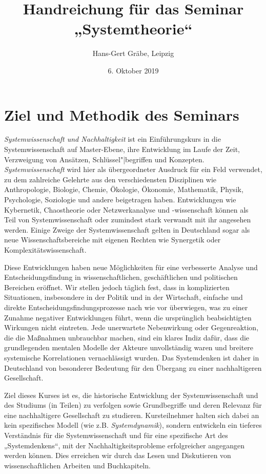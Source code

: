 \documentclass[11pt,a4paper]{article}
\title{Handreichung für das Seminar „Systemtheorie“}
\author{Hans-Gert Gr\"abe, Leipzig}
\date{6. Oktober 2019}
\begin{document}
\maketitle

\section{Ziel und Methodik des Seminars}

\emph{Systemwissenschaft und Nachhaltigkeit} ist ein Einführungskurs in die
Systemwissenschaft auf Master-Ebene, ihre Entwicklung im Laufe der Zeit,
Verzweigung von Ansätzen, Schlüssel"|begriffen und Konzepten.
\emph{Systemwissenschaft} wird hier als übergeordneter Ausdruck für ein Feld
verwendet, zu dem zahlreiche Gelehrte aus den verschiedensten Disziplinen wie
Anthropologie, Biologie, Chemie, Ökologie, Ökonomie, Mathematik, Physik,
Psychologie, Soziologie und andere beigetragen haben. Entwicklungen wie
Kybernetik, Chaostheorie oder Netzwerkanalyse und -wissenschaft können als
Teil von Systemwissenschaft oder zumindest stark verwandt mit ihr angesehen
werden.  Einige Zweige der Systemwissenschaft gelten in Deutschland sogar als
neue Wissenschaftsbereiche mit eigenen Rechten wie Synergetik oder
Komplexitätswissenschaft.

Diese Entwicklungen haben neue Möglichkeiten für eine verbesserte Analyse und
Entscheidungsfindung in wissenschaftlichen, geschäftlichen und politischen
Bereichen eröffnet. Wir stellen jedoch täglich fest, dass in komplizierten
Situationen, insbesondere in der Politik und in der Wirtschaft, einfache und
direkte Entscheidungsfindungsprozesse nach wie vor überwiegen, was zu einer
Zunahme negativer Entwicklungen führt, wenn die ursprünglich beabsichtigten
Wirkungen nicht eintreten. Jede unerwartete Nebenwirkung oder Gegenreaktion,
die die Maßnahmen unbrauchbar machen, sind ein klares Indiz dafür, dass die
grundlegenden mentalen Modelle der Akteure unvollständig waren und breitere
systemische Korrelationen vernachlässigt wurden. Das Systemdenken ist daher in
Deutschland von besonderer Bedeutung für den Übergang zu einer nachhaltigeren
Gesellschaft.

Ziel dieses Kurses ist es, die historische Entwicklung der Systemwissenschaft
und des Studiums (in Teilen) zu verfolgen sowie Grundbegriffe und deren
Relevanz für eine nachhaltigere Gesellschaft zu studieren. Kursteilnehmer
halten sich dabei an kein spezifisches Modell (wie z.B. \emph{Systemdynamik}),
sondern entwickeln ein tieferes Verständnis für die Systemwissenschaft und für
eine spezifische Art des „Systemdenkens“, mit der Nachhaltigkeitsprobleme
erfolgreicher angegangen werden können. Dies erreichen wir durch das Lesen und
Diskutieren von wissenschaftlichen Arbeiten und Buchkapiteln.
\end{document}
